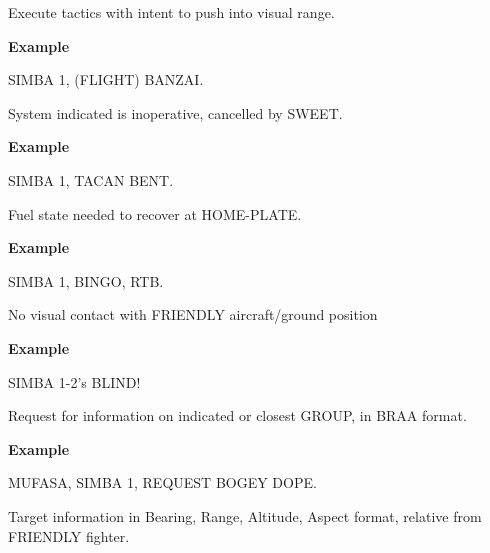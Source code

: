 \begin{tcoloritemize}
    \blueitem[BANZAI]
    Execute tactics with intent to push into visual range.

    \medskip
    \textbf{Example}
    \begin{center}
        \begin{minipage}{0.9\textwidth}
            SIMBA 1, (FLIGHT) BANZAI.
        \end{minipage}
    \end{center}

    \blueitem[BENT]
    System indicated is inoperative, cancelled by SWEET.

    \medskip
    \textbf{Example}
    \begin{center}
        \begin{minipage}{0.9\textwidth}
            SIMBA 1, TACAN BENT.
        \end{minipage}
    \end{center}

    \blueitem[BINGO]
    Fuel state needed to recover at HOME-PLATE.

    \medskip
    \textbf{Example}
    \begin{center}
        \begin{minipage}{0.9\textwidth}
            SIMBA 1, BINGO, RTB.
        \end{minipage}
    \end{center}

    \blueitem[BLIND]
    No visual contact with FRIENDLY aircraft/ground position

    \medskip
    \textbf{Example}
    \begin{center}
        \begin{minipage}{0.9\textwidth}
            SIMBA 1-2's BLIND!
        \end{minipage}
    \end{center}

    Request for information on indicated or closest GROUP, in BRAA format.

    \medskip
    \textbf{Example}
    \begin{center}
        \begin{minipage}{0.9\textwidth}
            MUFASA, SIMBA 1, REQUEST BOGEY DOPE. \newline
        \end{minipage}
    \end{center}

    \blueitem[BRAA] 
    Target information in Bearing, Range, Altitude, Aspect format, relative from FRIENDLY fighter.


\end{tcoloritemize}
